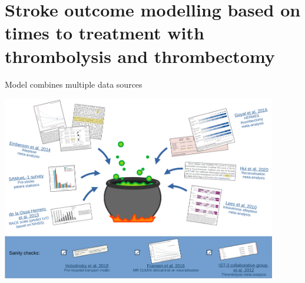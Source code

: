 \documentclass[xcolor={usenames,dvipsnames}]{beamer}
\begin{document}

\section{Stroke outcome modelling based on times to treatment with thrombolysis and thrombectomy}




\begin{frame}{Model combines multiple data sources}

\begin{center}
\includegraphics[width=0.90\textwidth]{./images/data_couldron}
\end{center}
    
\end{frame}

\end{document}
